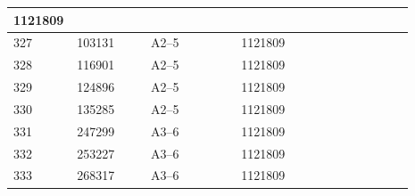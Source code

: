 \documentclass[UTF8,10pt,a4paper,fontset=fandol]{ctexart}
\newcommand{\fieldvalue}[1]{#1}
\begin{document}
\begin{center}
\begin{tabular}{|p{0.07\linewidth}|p{0.18\linewidth}|p{0.22\linewidth}|p{0.22\linewidth}|p{0.20\linewidth}|}
\fieldvalue{1121809} & \\ \hline
\fieldvalue{327} &
\fieldvalue{103131} &
\fieldvalue{A2--5} &
\fieldvalue{1121809} & \\ \hline
\fieldvalue{328} &
\fieldvalue{116901} &
\fieldvalue{A2--5} &
\fieldvalue{1121809} & \\ \hline
\fieldvalue{329} &
\fieldvalue{124896} &
\fieldvalue{A2--5} &
\fieldvalue{1121809} & \\ \hline
\fieldvalue{330} &
\fieldvalue{135285} &
\fieldvalue{A2--5} &
\fieldvalue{1121809} & \\ \hline
\fieldvalue{331} &
\fieldvalue{247299} &
\fieldvalue{A3--6} &
\fieldvalue{1121809} & \\ \hline
\fieldvalue{332} &
\fieldvalue{253227} &
\fieldvalue{A3--6} &
\fieldvalue{1121809} & \\ \hline
\fieldvalue{333} &
\fieldvalue{268317} &
\fieldvalue{A3--6} &
\fieldvalue{1121809} & \\ \hline

\end{tabular}
\end{center}
\end{document}
